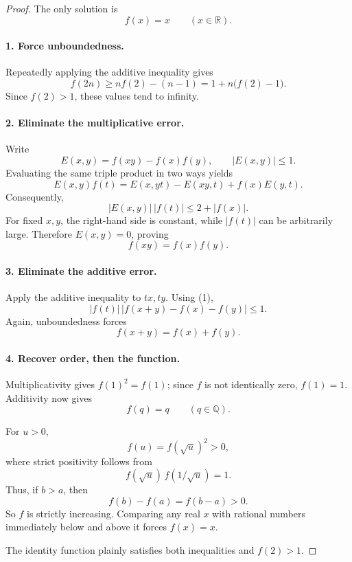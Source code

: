 
\begin{dlsummary}[title={\bfseries Solution 42. Bounded Errors, Exact Answer},breakable]

\begin{proof}
The only solution is
\[
\boxed{f(x)=x\qquad(x\in\mathbb R).}
\]

\paragraph{1. Force unboundedness.}

Repeatedly applying the additive inequality gives
\[
f(2n)\ge nf(2)-(n-1)
=1+n\bigl(f(2)-1\bigr).
\]
Since \(f(2)>1\), these values tend to infinity.

\paragraph{2. Eliminate the multiplicative error.}

Write
\[
E(x,y)=f(xy)-f(x)f(y),\qquad |E(x,y)|\le1.
\]
Evaluating the same triple product in two ways yields
\[
E(x,y)f(t)
=E(x,yt)-E(xy,t)+f(x)E(y,t).
\]
Consequently,
\[
|E(x,y)|\,|f(t)|\le2+|f(x)|.
\]
For fixed \(x,y\), the right-hand side is constant, while \(|f(t)|\) can be arbitrarily large. Therefore \(E(x,y)=0\), proving
\[
f(xy)=f(x)f(y). \tag{1}
\]

\paragraph{3. Eliminate the additive error.}

Apply the additive inequality to \(tx,ty\). Using (1),
\[
|f(t)|\,|f(x+y)-f(x)-f(y)|\le1.
\]
Again, unboundedness forces
\[
f(x+y)=f(x)+f(y). \tag{2}
\]

\paragraph{4. Recover order, then the function.}

Multiplicativity gives \(f(1)^2=f(1)\); since \(f\) is not identically zero, \(f(1)=1\). Additivity now gives
\[
f(q)=q\qquad(q\in\mathbb Q).
\]

For \(u>0\),
\[
f(u)=f(\sqrt u)^2>0,
\]
where strict positivity follows from
\[
f(\sqrt u)\,f(1/\sqrt u)=1.
\]
Thus, if \(b>a\), then
\[
f(b)-f(a)=f(b-a)>0.
\]
So \(f\) is strictly increasing. Comparing any real \(x\) with rational numbers immediately below and above it forces \(f(x)=x\).

The identity function plainly satisfies both inequalities and \(f(2)>1\).
\end{proof}
\end{dlsummary}

